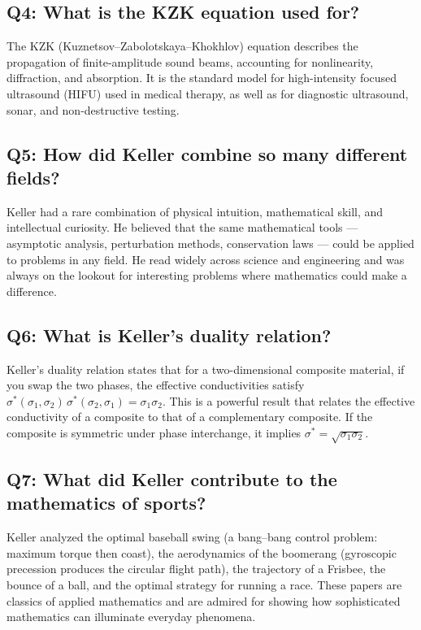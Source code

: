 \subsection*{Q4: What is the KZK equation used for?}

The KZK (Kuznetsov--Zabolotskaya--Khokhlov) equation describes the propagation of finite-amplitude sound beams, accounting for nonlinearity, diffraction, and absorption. It is the standard model for high-intensity focused ultrasound (HIFU) used in medical therapy, as well as for diagnostic ultrasound, sonar, and non-destructive testing.

\subsection*{Q5: How did Keller combine so many different fields?}

Keller had a rare combination of physical intuition, mathematical skill, and intellectual curiosity. He believed that the same mathematical tools --- asymptotic analysis, perturbation methods, conservation laws --- could be applied to problems in any field. He read widely across science and engineering and was always on the lookout for interesting problems where mathematics could make a difference.

\subsection*{Q6: What is Keller's duality relation?}

Keller's duality relation states that for a two-dimensional composite material, if you swap the two phases, the effective conductivities satisfy \(\sigma^*(\sigma_1, \sigma_2) \, \sigma^*(\sigma_2, \sigma_1) = \sigma_1 \sigma_2\). This is a powerful result that relates the effective conductivity of a composite to that of a complementary composite. If the composite is symmetric under phase interchange, it implies \(\sigma^* = \sqrt{\sigma_1 \sigma_2}\).

\subsection*{Q7: What did Keller contribute to the mathematics of sports?}

Keller analyzed the optimal baseball swing (a bang--bang control problem: maximum torque then coast), the aerodynamics of the boomerang (gyroscopic precession produces the circular flight path), the trajectory of a Frisbee, the bounce of a ball, and the optimal strategy for running a race. These papers are classics of applied mathematics and are admired for showing how sophisticated mathematics can illuminate everyday phenomena.

